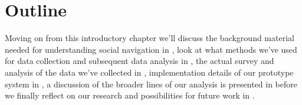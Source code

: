 \section{Outline}

Moving on from this introductory chapter we'll discuss the background
material needed for understanding social
navigation in , look at what methods we've
used for data collection and subsequent data analysis in
, the actual survey and analysis of the data
we've collected in , implementation details
of our prototype system in , a discussion of the
broader lines of our analysis is presented in 
before we finally reflect on our research and possibilities for future work
in .
